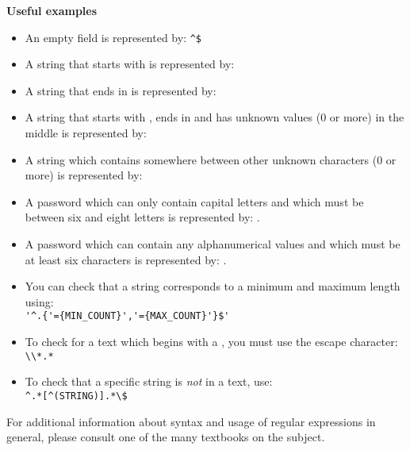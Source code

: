 \textbf{Useful examples}
\begin{itemize}
\item An empty field is represented by: \verb+^$+%
\item A string that starts with  is represented by: 
\item A string that ends in  is represented by: 
\item A string that starts with , ends in  and has unknown values (0 or more) in the middle is represented by: 
\item A string which contains  somewhere between other unknown characters (0 or more) is represented by: 
\item A password which can only contain capital letters and which must be between six and eight letters is represented by: .
\item A password which can contain any alphanumerical values and which must be at least six characters is represented by: .
\item You can check that a string corresponds to a minimum and maximum length using: \\
\verb#'^.{'={MIN_COUNT}','={MAX_COUNT}'}$'#
\item To check for a text which begins with a \bxshell{*}, you must use the escape character: \verb+\\*.*+
\item To check that a specific string is \textit{not} in a text, use:\\
 \verb+^.*[^(STRING)].*\$+
\end{itemize}


For additional information about syntax and usage of regular
expressions in general, please consult one
of the many textbooks on the subject.
